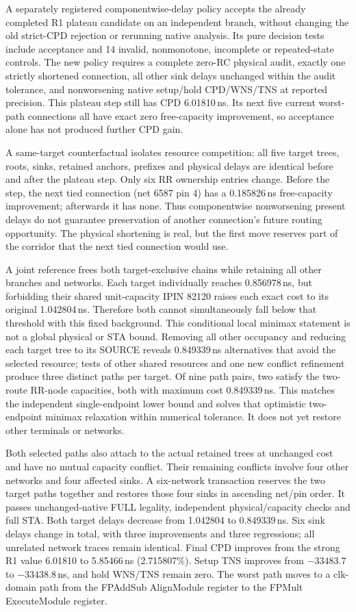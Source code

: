 A separately registered componentwise-delay policy accepts the already completed R1 plateau candidate on an independent branch, without changing the old strict-CPD rejection or rerunning native analysis. Its pure decision tests include acceptance and 14 invalid, nonmonotone, incomplete or repeated-state controls. The new policy requires a complete zero-RC physical audit, exactly one strictly shortened connection, all other sink delays unchanged within the audit tolerance, and nonworsening native setup/hold CPD/WNS/TNS at reported precision. This plateau step still has CPD 6.01810\,ns. Its next five current worst-path connections all have exact zero free-capacity improvement, so acceptance alone has not produced further CPD gain.

A same-target counterfactual isolates resource competition: all five target trees, roots, sinks, retained anchors, prefixes and physical delays are identical before and after the plateau step. Only six RR ownership entries change. Before the step, the next tied connection (net 6587 pin 4) has a 0.185826\,ns free-capacity improvement; afterwards it has none. Thus componentwise nonworsening present delays do not guarantee preservation of another connection's future routing opportunity. The physical shortening is real, but the first move reserves part of the corridor that the next tied connection would use.

A joint reference frees both target-exclusive chains while retaining all other branches and networks. Each target individually reaches 0.856978\,ns, but forbidding their shared unit-capacity IPIN 82120 raises each exact cost to its original 1.042804\,ns. Therefore both cannot simultaneously fall below that threshold with this fixed background. This conditional local minimax statement is not a global physical or STA bound. Removing all other occupancy and reducing each target tree to its SOURCE reveals 0.849339\,ns alternatives that avoid the selected resource; tests of other shared resources and one new conflict refinement produce three distinct paths per target. Of nine path pairs, two satisfy the two-route RR-node capacities, both with maximum cost 0.849339\,ns. This matches the independent single-endpoint lower bound and solves that optimistic two-endpoint minimax relaxation within numerical tolerance. It does not yet restore other terminals or networks.

Both selected paths also attach to the actual retained trees at unchanged cost and have no mutual capacity conflict. Their remaining conflicts involve four other networks and four affected sinks. A six-network transaction reserves the two target paths together and restores those four sinks in ascending net/pin order. It passes unchanged-native FULL legality, independent physical/capacity checks and full STA. Both target delays decrease from 1.042804 to 0.849339\,ns. Six sink delays change in total, with three improvements and three regressions; all unrelated network traces remain identical. Final CPD improves from the strong R1 value 6.01810 to 5.85466\,ns (2.715807\%). Setup TNS improves from $-33483.7$ to $-33438.8$\,ns, and hold WNS/TNS remain zero. The worst path moves to a clk-domain path from the FPAddSub AlignModule register to the FPMult ExecuteModule register.

